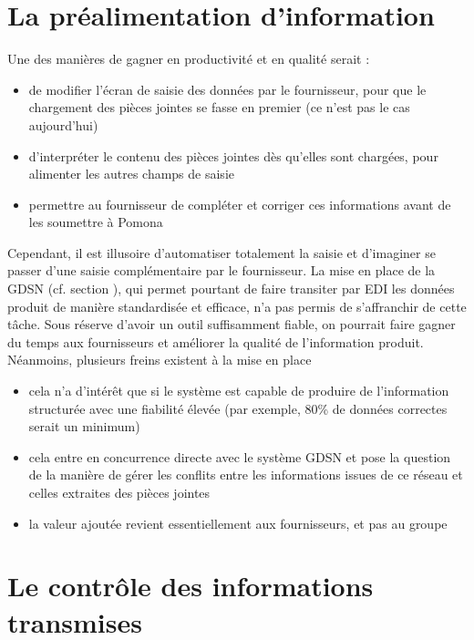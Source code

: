         \section{La préalimentation d'information}
        Une des manières de gagner en productivité et en qualité serait :
        \begin{itemize}
            \item de modifier l'écran de saisie des données par le fournisseur, pour que le chargement des pièces jointes se fasse en premier (ce n'est pas le cas aujourd'hui)
            \item d'interpréter le contenu des pièces jointes dès qu'elles sont chargées, pour alimenter les autres champs de saisie
            \item permettre au fournisseur de compléter et corriger ces informations avant de les soumettre à Pomona
        \end{itemize} 
        Cependant, il est illusoire d'automatiser totalement la saisie et d'imaginer se passer d'une saisie complémentaire par le fournisseur.
        La mise en place de la GDSN (cf. section ), qui permet pourtant de faire transiter par EDI les données produit de manière standardisée et efficace, n'a pas permis de s'affranchir de cette tâche.
        Sous réserve d'avoir un outil suffisamment fiable, on pourrait faire gagner du temps aux fournisseurs et améliorer la qualité de l'information produit.
        Néanmoins, plusieurs freins existent à la mise en place 
        \begin{itemize}
            \item cela n'a d'intérêt que si le système est capable de produire de l'information structurée avec une fiabilité élevée (par exemple, 80\% de données correctes serait un minimum)
            \item cela entre en concurrence directe avec le système GDSN et pose la question de la manière de gérer les conflits entre les informations issues de ce réseau et celles extraites des pièces jointes
            \item la valeur ajoutée revient essentiellement aux fournisseurs, et pas au groupe
        \end{itemize}

        \section{Le contrôle des informations transmises}

